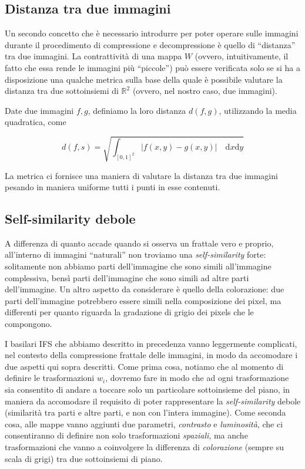\documentclass[11pt,a4paper,appendixprefix=true,numbers=noenddot]{scrreprt}
\begin{document}
\subsection*{Distanza tra due immagini}

Un secondo concetto che è necessario introdurre per poter operare sulle immagini durante il procedimento di compressione e decompressione è quello di ``distanza'' tra due immagini. La contrattività di una mappa $W$ (ovvero, intuitivamente, il fatto che essa rende le immagini più ``piccole'') può essere verificata solo se si ha a disposizione una qualche metrica sulla base della quale è possibile valutare la distanza tra due sottoinsiemi di $\mathbb{R}^2$ (ovvero, nel nostro caso, due immagini).

Date due immagini $f, g$, definiamo la loro distanza $d(f, g)$, utilizzando la media quadratica, come

\[
d(f,s) = \sqrt{\int_{[0,1]^2} \big|f(x,y) - g(x,y)\big| \quad \text{d}x\text{d}y }
\]

La metrica ci fornisce una maniera di valutare la distanza tra due immagini pesando in maniera uniforme tutti i punti in esse contenuti.

\subsection*{Self-similarity debole}

A differenza di quanto accade quando si osserva un frattale vero e proprio, all'interno di immagini ``naturali'' non troviamo una \emph{self-similarity} forte: solitamente non abbiamo parti dell'immagine che sono simili all'immagine complessiva, bensì parti dell'immagine che sono simili ad altre parti dell'immagine. Un altro aspetto da considerare è quello della colorazione: due parti dell'immagine potrebbero essere simili nella composizione dei pixel, ma differenti per quanto riguarda la gradazione di grigio dei pixels che le compongono. 

I basilari IFS che abbiamo descritto in precedenza vanno leggermente complicati, nel contesto della compressione frattale delle immagini, in modo da accomodare i due aspetti qui sopra descritti. Come prima cosa, notiamo che al momento di definire le trasformazioni $w_i$, dovremo fare in modo che ad ogni trasformazione sia consentito di andare a toccare solo un particolare sottoinsieme del piano, in maniera da accomodare il requisito di poter rappresentare la \emph{self-similarity} debole (similarità tra parti e altre parti, e non con l'intera immagine). Come seconda cosa, alle mappe vanno aggiunti due parametri, \emph{contrasto} e \emph{luminosità}, che ci consentiranno di definire non solo trasformazioni  \emph{spaziali}, ma anche trasformazioni che vanno a coinvolgere la differenza di \emph{colorazione} (sempre su scala di grigi) tra due sottoinsiemi di piano.
\end{document}
